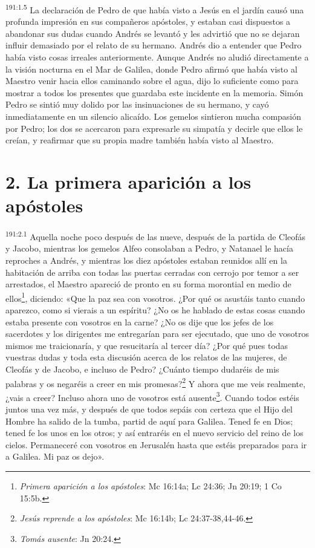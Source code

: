 \par 
\textsuperscript{191:1.5} La declaración de Pedro de que había visto a Jesús en el jardín causó una profunda impresión en sus compañeros apóstoles, y estaban casi dispuestos a abandonar sus dudas cuando Andrés se levantó y les advirtió que no se dejaran influir demasiado por el relato de su hermano. Andrés dio a entender que Pedro había visto cosas irreales anteriormente. Aunque Andrés no aludió directamente a la visión nocturna en el Mar de Galilea, donde Pedro afirmó que había visto al Maestro venir hacia ellos caminando sobre el agua, dijo lo suficiente como para mostrar a todos los presentes que guardaba este incidente en la memoria. Simón Pedro se sintió muy dolido por las insinuaciones de su hermano, y cayó inmediatamente en un silencio alicaído. Los gemelos sintieron mucha compasión por Pedro; los dos se acercaron para expresarle su simpatía y decirle que ellos le creían, y reafirmar que su propia madre también había visto al Maestro.

\section*{2. La primera aparición a los apóstoles}
\par 
\textsuperscript{191:2.1} Aquella noche poco después de las nueve, después de la partida de Cleofás y Jacobo, mientras los gemelos Alfeo consolaban a Pedro, y Natanael le hacía reproches a Andrés, y mientras los diez apóstoles estaban reunidos allí en la habitación de arriba con todas las puertas cerradas con cerrojo por temor a ser arrestados, el Maestro apareció de pronto en su forma morontial en medio de ellos\footnote{\textit{Primera aparición a los apóstoles}: Mc 16:14a; Lc 24:36; Jn 20:19; 1 Co 15:5b.}, diciendo: «Que la paz sea con vosotros. ¿Por qué os asustáis tanto cuando aparezco, como si vierais a un espíritu? ¿No os he hablado de estas cosas cuando estaba presente con vosotros en la carne? ¿No os dije que los jefes de los sacerdotes y los dirigentes me entregarían para ser ejecutado, que uno de vosotros mismos me traicionaría, y que resucitaría al tercer día? ¿Por qué pues todas vuestras dudas y toda esta discusión acerca de los relatos de las mujeres, de Cleofás y de Jacobo, e incluso de Pedro? ¿Cuánto tiempo dudaréis de mis palabras y os negaréis a creer en mis promesas?\footnote{\textit{Jesús reprende a los apóstoles}: Mc 16:14b; Lc 24:37-38,44-46.} Y ahora que me veis realmente, ¿vais a creer? Incluso ahora uno de vosotros está ausente\footnote{\textit{Tomás ausente}: Jn 20:24.}. Cuando todos estéis juntos una vez más, y después de que todos sepáis con certeza que el Hijo del Hombre ha salido de la tumba, partid de aquí para Galilea. Tened fe en Dios; tened fe los unos en los otros; y así entraréis en el nuevo servicio del reino de los cielos. Permaneceré con vosotros en Jerusalén hasta que estéis preparados para ir a Galilea. Mi paz os dejo».


